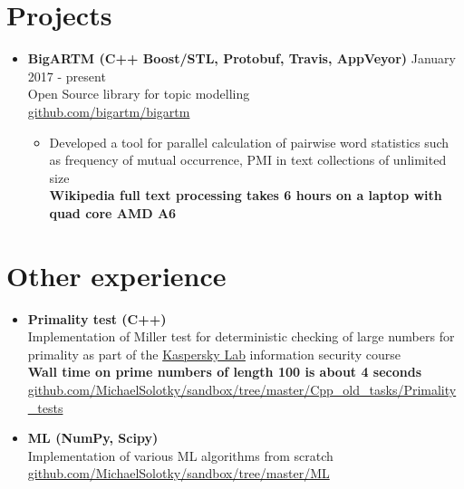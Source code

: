 \documentclass[letterpaper,11pt]{article}
\newcommand{\resumeSubHeadingListStart}{\begin{itemize}[leftmargin=*]}
\newcommand{\resumeSubHeadingListEnd}{\end{itemize}}
\begin{document}
\section{Projects}
\resumeSubHeadingListStart
    \item{
      \textbf{{BigARTM}{ (C++ Boost/STL, Protobuf, Travis, AppVeyor)}}
      \hfill
      January 2017 - present
    } \\
    Open Source library for topic modelling \\
    \faGithub \enspace \href{https://github.com/bigartm/bigartm}{\color{blue} github.com/bigartm/bigartm}
    \begin{itemize}
      \item Developed a tool for parallel calculation of pairwise word statistics such as frequency of mutual occurrence, PMI in text collections of unlimited size \\
      \textbf{Wikipedia full text processing takes 6 hours on a laptop with quad core AMD A6}
    \end{itemize}

  \resumeSubHeadingListEnd


\section{Other experience}
  \resumeSubHeadingListStart
      \item{
        \textbf{{Primality test}{ (C++) }} \\
        Implementation of Miller test for deterministic checking of large numbers for primality as part of the \href{https://www.kaspersky.com/}{\color{blue} Kaspersky Lab} information security course \\
        \textbf{Wall time on prime numbers of length 100 is about 4 seconds} \\
        \faGithub \enspace \href{https://github.com/MichaelSolotky/sandbox/tree/master/Cpp_old_tasks/Primality_tests}{\color{blue} github.com/MichaelSolotky/sandbox/tree/master/Cpp\_old\_tasks/Primality\_tests}
      }

      \item{
        \textbf{ML (NumPy, Scipy)} \\
        Implementation of various ML algorithms from scratch \\
        \faGithub \enspace \href{https://github.com/MichaelSolotky/sandbox/tree/master/ML}{\color{blue} github.com/MichaelSolotky/sandbox/tree/master/ML}
      }
      \resumeSubHeadingListEnd
\end{document}
